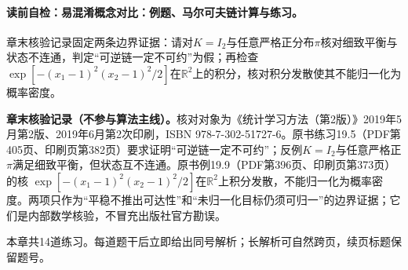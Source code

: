 \paragraph{读前自检：易混淆概念对比：例题、马尔可夫链计算与练习。}章末核验记录固定两条边界证据：请对$K=I_2$与任意严格正分布$\pi$核对细致平衡与状态不连通，判定“可逆链一定不可约”为假；再检查$\exp[-(x_1-1)^2(x_2-1)^2/2]$在$\mathbb R^2$上的积分，核对积分发散使其不能归一化为概率密度。\par

\begin{comparisonbox}
\textbf{章末核验记录（不参与算法主线）。}核对对象为《统计学习方法（第2版）》2019年5月第2版、2019年6月第2次印刷，ISBN 978-7-302-51727-6。原书练习19.5（PDF第405页、印刷页第382页）要求证明“可逆链一定不可约”；反例$K=I_2$与任意严格正$\pi$满足细致平衡，但状态互不连通。原书例19.9（PDF第396页、印刷页第373页）的核
$\exp[-(x_1-1)^2(x_2-1)^2/2]$在$\mathbb R^2$上积分发散，不能归一化为概率密度。两项只作为“平稳不推出可达性”和“未归一化目标仍须可归一”的边界证据；它们是内部数学核验，不冒充出版社官方勘误。
\end{comparisonbox}

\begin{chapterexercisebox}
\label{struct:V5-C03-CH35}
本章共14道练习。每道题干后立即给出同号解析；长解析可自然跨页，续页标题保留题号。
\end{chapterexercisebox}

